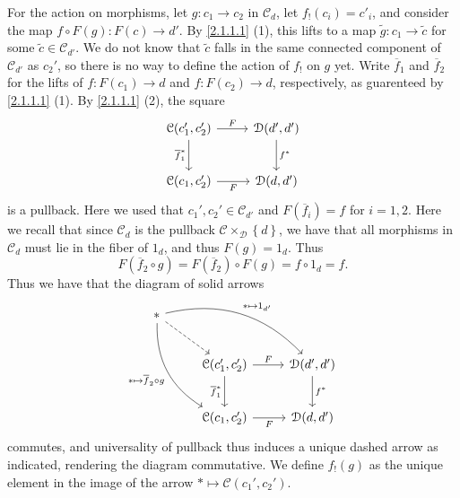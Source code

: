 For the action on morphisms, let $g : c_1 \to c_2$ in $\mathcal{C} _d$, let $f_!(c_i)=c'_i$, and consider the map $f\circ F(g): F(c) \to d'$. By \cref{2.1.1.1} (1), this lifts to a map $\widetilde{g} : c_1 \to \widetilde{c}$ for some $\widetilde{c}\in \mathcal{C} _{d'} $. We do not know that $\widetilde{c}$ falls in the same connected component of $\mathcal{C} _{d'} $ as $c_2'$, so there is no way to define the action of $f_!$ on $g$ yet. Write $\overline{f} _{1} $ and $\overline{f} _2$ for the lifts of $f : F(c_1) \to d$ and $f : F(c_2) \to d$, respectively, as guarenteed by \cref{2.1.1.1} (1). By \cref{2.1.1.1} (2), the square
\[\begin{tikzcd}[row sep = 2.5em, column sep = 2.5em]
	\mathcal{C} (c_1',c_2')\ar[" F ", r] \ar[" \overline{f} _1^* "', d]  & \mathcal{D} (d',d')\ar[" f^* ", d]  \\
\mathcal{C} (c_1,c_2')\ar[" F "', r]  & \mathcal{D} (d,d')
\end{tikzcd}\]
is a pullback. Here we used that $c_1',c_2'\in \mathcal{C} _{d'} $ and $F(\overline{f} _i)=f$ for $i=1,2$. Here we recall that since $\mathcal{C} _d$ is the pullback $\mathcal{C} \times _\mathcal{D} \left\{ d \right\} $, we have that all morphisms in $\mathcal{C} _d$ must lie in the fiber of $1_d$, and thus $F(g)=1_d$. Thus
\[
	F(\overline{f} _2 \circ g)=F(\overline{f} _2)\circ F(g)=f\circ 1_d=f
.\]
Thus we have that the diagram of solid arrows
\[\begin{tikzcd}[row sep = 2.5em, column sep = 2.5em]
* \ar[" *\mapsto 1_{d'} ", bend left, drr] \ar[" *\mapsto \overline{f} _2\circ g "', bend right, ddr] \ar[dashed, dr]  &  &  \\
 & \mathcal{C} (c_1',c_2')\ar[" F ", r] \ar[" \overline{f} _1^* "', d]  & \mathcal{D} (d',d')\ar[" f^* ", d]  \\
 & \mathcal{C} (c_1,c_2')\ar[" F "', r]  & \mathcal{D} (d,d')
\end{tikzcd}\]
commutes, and universality of pullback thus induces a unique dashed arrow as indicated, rendering the diagram commutative. We define $f_!(g)$ as the unique element in the image of the arrow $*\mapsto \mathcal{C} (c_1',c_2')$.

